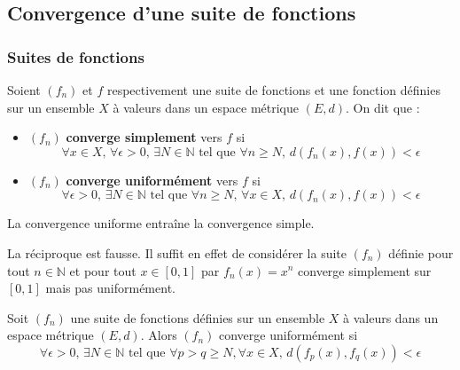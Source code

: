 




  \subsection{Convergence d'une suite de fonctions}

  \subsubsection{Suites de fonctions}


  \begin{definition}
    Soient $(f_n)$ et $f$ respectivement une suite de fonctions et une fonction définies sur un ensemble $X$ à valeurs dans un espace métrique $(E, d)$. On dit que :
    \begin{itemize}
      \item $(f_n)$ \textbf{converge simplement} vers $f$ si
      \[ \forall x \in X, \, \forall \epsilon > 0, \, \exists N \in \mathbb{N} \text{ tel que } \forall n \geq N, \, d(f_n(x), f(x)) < \epsilon \]
      \item $(f_n)$ \textbf{converge uniformément} vers $f$ si
      \[ \forall \epsilon > 0, \, \exists N \in \mathbb{N} \text{ tel que } \forall n \geq N, \, \forall x \in X, \, d(f_n(x), f(x)) < \epsilon \]
    \end{itemize}
  \end{definition}

  \begin{proposition}
    La convergence uniforme entraîne la convergence simple.
  \end{proposition}

  \begin{cexample}
    La réciproque est fausse. Il suffit en effet de considérer la suite $(f_n)$ définie pour tout $n \in \mathbb{N}$ et pour tout $x \in [0,1]$ par $f_n(x) = x^n$ converge simplement sur $[0,1]$ mais pas uniformément.
  \end{cexample}

  \begin{theorem}
    Soit $(f_n)$ une suite de fonctions définies sur un ensemble $X$ à valeurs dans un espace métrique $(E, d)$. Alors $(f_n)$ converge uniformément si
    \[ \forall \epsilon > 0, \, \exists N \in \mathbb{N} \text{ tel que } \forall p > q \geq N, \forall x \in X, \, d(f_p(x), f_q(x)) < \epsilon \]
  \end{theorem}

